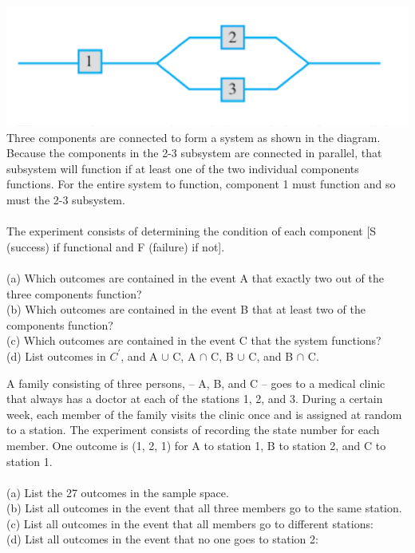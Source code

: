 \documentclass[12pt,letterpaper]{hmcpset}
\begin{document}

\begin{problem}[2.1.3]
\includegraphics[scale=1]{Nov_3_1.png}\\
    Three components are connected to form a system as shown in the diagram. Because the components in the 2-3 subsystem are connected in parallel, that subsystem will function if at least one of the two individual components functions. For the entire system to function, component 1 must function and so must the 2-3 subsystem.\\ \\
    The experiment consists of determining the condition of each component [S (success) if functional and F (failure) if not].
\\ \\
(a) Which outcomes are contained in the event A that exactly two out of the three components function?
\\
(b) Which outcomes are contained in the event B that at least two of the components function?
\\
(c) Which outcomes are contained in the event C that the system functions?
\\
(d) List outcomes in $C^\prime$, and A $\cup$ C, A $\cap$ C, B $\cup$ C, and B $\cap$ C.

\end{problem}

\begin{solution}

\end{solution}
\newpage

\begin{problem}[2.1.5]

A family consisting of three persons, – A, B, and C – goes to a medical clinic that always has a doctor at each of the stations 1, 2, and 3. During a certain week, each member of the family visits the clinic once and is assigned at random to a station. The experiment consists of recording the state number for each member. One outcome is (1, 2, 1) for A to station 1, B to station 2, and C to station 1. 
\\ \\
(a) List the 27 outcomes in the sample space.
\\
(b) List all outcomes in the event that all three members go to the same station.
\\
(c) List all outcomes in the event that all members go to different stations:
\\
(d) List all outcomes in the event that no one goes to station 2:



\end{problem}
\end{document}
